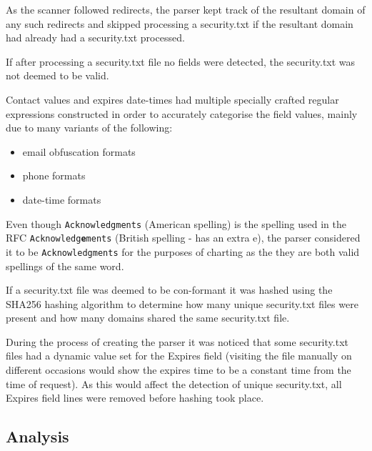 \documentclass{mscreport}
\begin{document}
\vspace{0.3cm} \noindent
As the scanner followed redirects, the parser kept track of the resultant domain of any such redirects and skipped processing a security.txt if the resultant domain had already had a security.txt processed.

\vspace{0.3cm} \noindent
If after processing a security.txt file no fields were detected, the security.txt was not deemed to be valid.

\vspace{0.3cm} \noindent
Contact values and expires date-times had multiple specially crafted regular expressions constructed in order to accurately categorise the field values, mainly due to many variants of the following:

\begin{itemize}
	\setlength\itemsep{0.01em}
    \item email obfuscation formats
    \item phone formats
    \item date-time formats
\end{itemize}

\vspace{0.3cm} \noindent
Even though \texttt{Acknowledgments} (American spelling) is the spelling used in the RFC \newline  \texttt{Acknowledg\textbf{e}ments} (British spelling - has an extra e), the parser considered it to be \newline \texttt{Acknowledgments} for the purposes of charting as the they are both valid spellings of the same word.

\vspace{0.3cm} \noindent
If a security.txt file was deemed to be con-formant it was hashed using the SHA256 hashing algorithm to determine how many unique security.txt files were present and how many domains shared the same security.txt file.

\vspace{0.3cm} \noindent
During the process of creating the parser it was noticed that some security.txt files had a dynamic value set for the Expires field (visiting the file manually on different occasions would show the expires time to be a constant time from the time of request). As this would affect the detection of unique security.txt, all Expires field lines were removed before hashing took place.

\newpage

\subsection{Analysis}
\end{document}

